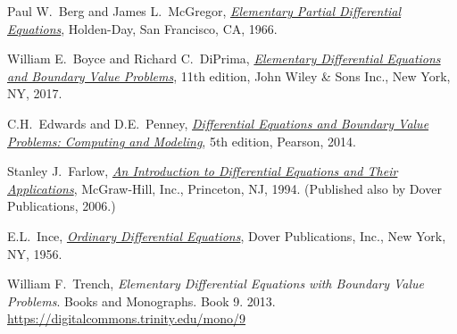 \documentclass[12pt]{book}
\begin{document}


\renewcommand{\bibname}{Further Reading}

\begin{thebibliography}{MM}


\label{furtherreading:chapter}

 Paul W.\ Berg and James L.\ McGregor, 
 \emph{\href{https://books.google.com/books?id=EfJQAAAAMAAJ}{Elementary
Partial Differential Equations}}, 
 Holden-Day,
 San Francisco, CA\@,
 1966.

 William E.\ Boyce and
 Richard C.\ DiPrima,
 \emph{\href{https://books.google.com/books?id=nYWcQgAACAAJ}{Elementary
Differential Equations and Boundary Value Problems}},
 11th edition,
 John Wiley \& Sons Inc.,
 New York, NY\@, 2017.

 C.H.\ Edwards and D.E.\ Penney,
 \emph{\href{https://books.google.com/books?id=wuWvoAEACAAJ}{Differential
Equations and Boundary Value Problems: Computing and Modeling}},
 5th edition,
 Pearson,
 2014.

 Stanley J.\ Farlow,
 \emph{\href{https://books.google.com/books?id=_ozWAAAAMAAJ}{An Introduction
to Differential Equations and Their Applications}},
 McGraw-Hill, Inc.,
 Princeton, NJ\@,
 1994.  (Published also by Dover Publications, 2006.)

 E.L.\ Ince,
 \emph{\href{https://books.google.com/books?id=uYz-pqUD75gC}{Ordinary
Differential Equations}},
 Dover Publications, Inc.,
 New York, NY\@,
 1956.

 William F.\ Trench,
 \emph{Elementary Differential Equations with Boundary Value
Problems}. Books and Monographs. Book 9.  2013.
\url{https://digitalcommons.trinity.edu/mono/9}

\end{thebibliography}
\end{document}
